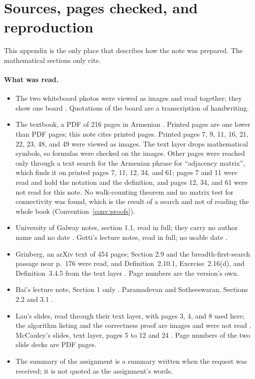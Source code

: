 \section{Sources, pages checked, and reproduction}\label{app:repro}

This appendix is the only place that describes how the note was prepared.
The mathematical sections only cite.

\paragraph{What was read.}
\begin{itemize}
\item The two whiteboard photos were viewed as images and read together;
  they show one board \cite{whiteboard1,whiteboard2}. Quotations of the
  board are a transcription of handwriting.
\item The textbook, a PDF of 216 pages in Armenian \cite{petrosyan2015graphs}.
  Printed pages are one lower than PDF pages; this note cites printed
  pages. Printed pages 7, 9, 11, 16, 21, 22, 23, 48, and 49 were viewed as
  images. The text layer drops mathematical symbols, so formulas were
  checked on the images. Other pages were reached only through a text
  search for the Armenian phrase for ``adjacency matrix'', which finds it on
  printed pages 7, 11, 12, 34, and 61; pages 7 and 11 were read and hold the
  notation and the definition, and pages 12, 34, and 61 were not read for
  this note. No walk-counting theorem and no matrix test for connectivity was
  found, which is the result of a search and not of reading the whole book
  (Convention~\ref{conv:proofs}).
\item University of Galway notes, section 1.1, read in full; they carry no
  author name and no date \cite{galwaynotes}. Gotti's lecture notes, read in
  full; no usable date \cite{gotti18211}.
\item Grinberg, an arXiv text of 454 pages; Section 2.9 and the
  breadth-first-search passage near p.~176 were read, and
  Definition~2.10.1, Exercise~2.16(d), and Definition~3.4.5 from the text
  layer \cite{grinberg2025graph}. Page numbers are the version's own.
\item Bai's lecture note, Section 1 only \cite{bai2025adjacency}.
  Paramadevan and Sotheeswaran, Sections 2.2 and 3.1 \cite{paramadevan2021adjacency}.
\item Lau's slides, read through their text layer, with pages 3, 4, and 8
  used here; the algorithm listing and the correctness proof are images and were not
  read \cite{lau2021bfs}. McCauley's slides, text layer, pages 5 to 12 and
  24 \cite{mccauley2025bfs}. Page numbers of the two slide decks are PDF
  pages.
\item The summary of the assignment \cite{userstatements} is a summary
  written when the request was received; it is not quoted as the
  assignment's words.
\end{itemize}

